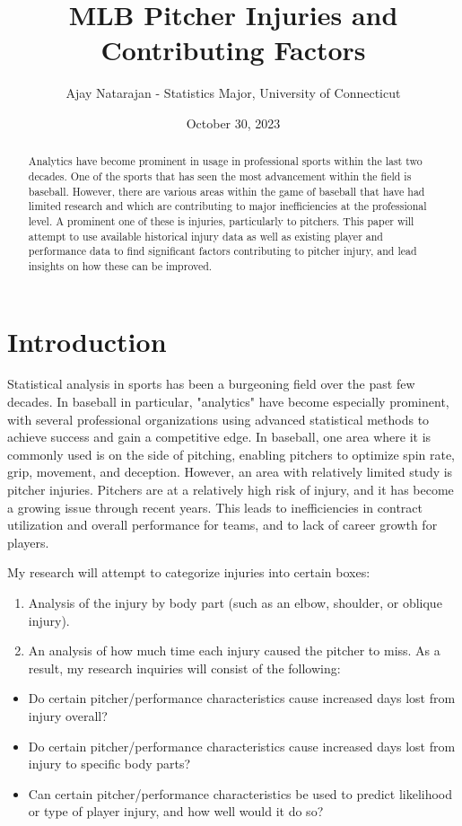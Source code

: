 \documentclass{article}
\title{MLB Pitcher Injuries and Contributing Factors}
\author{Ajay Natarajan - Statistics Major, University of Connecticut}
\date{October 30, 2023}
\begin{document}
\maketitle

\begin{abstract}
Analytics have become prominent in usage in professional sports within the last two decades. One of the sports that has seen the most advancement within the field is baseball. However, there are various areas within the game of baseball that have had limited research and which are contributing to major inefficiencies at the professional level. A prominent one of these is injuries, particularly to pitchers. This paper will attempt to use available historical injury data as well as existing player and performance data to find significant factors contributing to pitcher injury, and lead insights on how these can be improved.
\end{abstract}

\section{Introduction}
Statistical analysis in sports has been a burgeoning field over the past few decades. In baseball in particular, "analytics" have become especially prominent, with several professional organizations using advanced statistical methods to achieve success and gain a competitive edge. In baseball, one area where it is commonly used is on the side of pitching, enabling pitchers to optimize spin rate, grip, movement, and deception. However, an area with relatively limited study is pitcher injuries. Pitchers are at a relatively high risk of injury, and it has become a growing issue through recent years. This leads to inefficiencies in contract utilization and overall performance for teams, and to lack of career growth for players. 

My research will attempt to categorize injuries into certain boxes:
\begin{enumerate}
\item Analysis of the injury by body part (such as an elbow, shoulder, or oblique injury). 
\item An analysis of how much time each injury caused the pitcher to miss. As a result, my research inquiries will consist of the following:
\end{enumerate}
\begin{itemize}
  \item Do certain pitcher/performance characteristics cause increased days lost from injury overall?
  \item Do certain pitcher/performance characteristics cause increased days lost from injury to specific body parts?
  \item Can certain pitcher/performance characteristics be used to predict likelihood or type of player injury, and how well would it do so?
\end{itemize}
\end{document}
